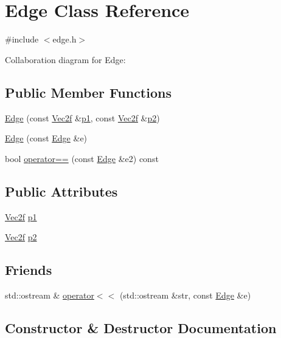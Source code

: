 \hypertarget{class_edge}{}\section{Edge Class Reference}
\label{class_edge}


{\ttfamily \#include $<$edge.\+h$>$}



Collaboration diagram for Edge\+:
\subsection*{Public Member Functions}
\begin{DoxyCompactItemize}
\item 
\hyperlink{class_edge_a46424efbe9a3753f10ed69734968b42a}{Edge} (const \hyperlink{class_vec2f}{Vec2f} \&\hyperlink{class_edge_a52f5f3c82f0241458a80008649cf2669}{p1}, const \hyperlink{class_vec2f}{Vec2f} \&\hyperlink{class_edge_a1f8d9abda73daf83db1780825ae0be0c}{p2})
\item 
\hyperlink{class_edge_a70ed9f4d5f93c9cc5273a34361781532}{Edge} (const \hyperlink{class_edge}{Edge} \&e)
\item 
bool \hyperlink{class_edge_a23eeba05e956cd2a398280537f0c518f}{operator==} (const \hyperlink{class_edge}{Edge} \&e2) const 
\end{DoxyCompactItemize}
\subsection*{Public Attributes}
\begin{DoxyCompactItemize}
\item 
\hyperlink{class_vec2f}{Vec2f} \hyperlink{class_edge_a52f5f3c82f0241458a80008649cf2669}{p1}
\item 
\hyperlink{class_vec2f}{Vec2f} \hyperlink{class_edge_a1f8d9abda73daf83db1780825ae0be0c}{p2}
\end{DoxyCompactItemize}
\subsection*{Friends}
\begin{DoxyCompactItemize}
\item 
std\+::ostream \& \hyperlink{class_edge_a05e7e89dad7ec4c7ea81da0b1f487a78}{operator$<$$<$} (std\+::ostream \&str, const \hyperlink{class_edge}{Edge} \&e)
\end{DoxyCompactItemize}


\subsection{Constructor \& Destructor Documentation}
